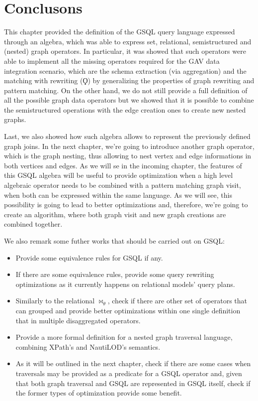 \section{Conclusons}
This chapter provided the definition of the GSQL query language expressed through an algebra, which was able to express set, relational, semistructured and (nested) graph operators. In particular, it was showed that such operators were able to implement all the missing operators required for the GAV data integration scenario, which are the schema extraction (via aggregation) and the matching with rewriting ($\Qoppa$) by generalizing the properties of graph rewriting and pattern matching. On the other hand, we do not still provide a full definition of all the possible graph data operators but  we showed that it is possible to combine the semistructured operations with the edge creation ones to create new nested graphs. 

Last, we also showed how such algebra allows to represent the previously defined graph joins. In the next chapter, we're going to introduce another graph operator, which is the graph nesting, thus allowing to nest vertex and edge informations in both vertices and edges. As we will se in the incoming chapter, the features of this GSQL algebra will be useful to provide optimization when a high level algebraic operator needs to be combined with a pattern matching graph visit, when both can be expressed within the same language. As we will see, this possibility is going to lead to better optimizations and, therefore, we're going to create an algorithm, where both graph visit and new graph creations are combined together.

We also remark some futher works that should be carried out on GSQL:
\begin{itemize}
\item Provide some equivalence rules for GSQL if any.
\item If there are some equivalence rules, provide some query rewriting optimizations as it currently happens on relational models' query plans. 
\item Similarly to the relational $\bowtie_\theta$, check if there are other set of operators that can grouped and provide better optimizations within one single definition that in multiple disaggregated operators.
\item Provide a more formal definition for a nested graph traversal language, combining XPath's and NautiLOD's semantics.
\item As it will be outlined in the next chapter, check if there are some cases when traversals may be provided as a predicate for a GSQL operator and, given that both graph traversal and GSQL are represented in GSQL itself, check if the former types of optimization provide some benefit.
\end{itemize} 
